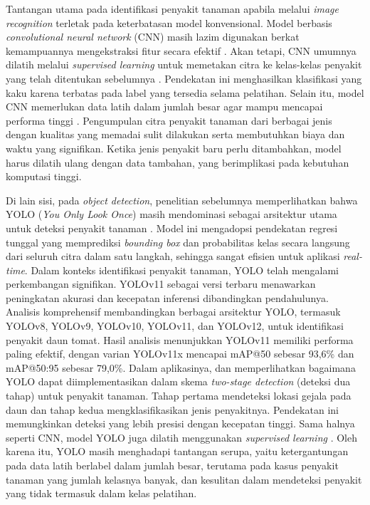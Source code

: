 Tantangan utama pada identifikasi penyakit tanaman apabila melalui \textit{image recognition} terletak pada keterbatasan model konvensional. Model berbasis \textit{convolutional neural network} (CNN) masih lazim digunakan berkat kemampuannya mengekstraksi fitur secara efektif \parencite{gulmezComprehensiveReviewConvolutional2025}. Akan tetapi, CNN umumnya dilatih melalui \textit{supervised learning} untuk memetakan citra ke kelas-kelas penyakit yang telah ditentukan sebelumnya \parencite{pacalSystematicReviewDeep2024}. Pendekatan ini menghasilkan klasifikasi yang kaku karena terbatas pada label yang tersedia selama pelatihan. Selain itu, model CNN memerlukan data latih dalam jumlah besar agar mampu mencapai performa tinggi \parencite{liuCrossModalDataFusion2025}. Pengumpulan citra penyakit tanaman dari berbagai jenis dengan kualitas yang memadai sulit dilakukan serta membutuhkan biaya dan waktu yang signifikan. Ketika jenis penyakit baru perlu ditambahkan, model harus dilatih ulang dengan data tambahan, yang berimplikasi pada kebutuhan komputasi tinggi.

Di lain sisi, pada \textit{object detection}, penelitian sebelumnya memperlihatkan bahwa YOLO (\textit{You Only Look Once}) masih mendominasi sebagai arsitektur utama untuk deteksi penyakit tanaman \parencite{ranaDetectionPlantDiseases2025}. Model ini mengadopsi pendekatan regresi tunggal yang memprediksi \textit{bounding box} dan probabilitas kelas secara langsung dari seluruh citra dalam satu langkah, sehingga sangat efisien untuk aplikasi \textit{real-time}. Dalam konteks identifikasi penyakit tanaman, YOLO telah mengalami perkembangan signifikan. YOLOv11 sebagai versi terbaru menawarkan peningkatan akurasi dan kecepatan inferensi dibandingkan pendahulunya. Analisis komprehensif \textcite{ramosComprehensiveAnalysisYOLO2025} membandingkan berbagai arsitektur YOLO, termasuk YOLOv8, YOLOv9, YOLOv10, YOLOv11, dan YOLOv12, untuk identifikasi penyakit daun tomat. Hasil analisis menunjukkan YOLOv11 memiliki performa paling efektif, dengan varian YOLOv11x mencapai mAP@50 sebesar 93,6\% dan mAP@50:95 sebesar 79,0\%. Dalam aplikasinya, \textcite{abhiramNovelTwoStageDeep2024} dan \textcite{yaoTwoStageDetectionAlgorithm2024} memperlihatkan bagaimana YOLO dapat diimplementasikan dalam skema \textit{two-stage detection} (deteksi dua tahap) untuk penyakit tanaman. Tahap pertama mendeteksi lokasi gejala pada daun dan tahap kedua mengklasifikasikan jenis penyakitnya. Pendekatan ini memungkinkan deteksi yang lebih presisi dengan kecepatan tinggi. Sama halnya seperti CNN, model YOLO juga dilatih menggunakan \textit{supervised learning} \parencite{pacalSystematicReviewDeep2024}. Oleh karena itu, YOLO masih menghadapi tantangan serupa, yaitu ketergantungan pada data latih berlabel dalam jumlah besar, terutama pada kasus penyakit tanaman yang jumlah kelasnya banyak, dan kesulitan dalam mendeteksi penyakit yang tidak termasuk dalam kelas pelatihan.

